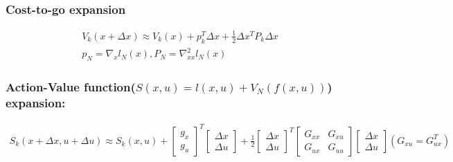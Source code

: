 \subsubsection{Cost-to-go expansion}
\begin{align}
    V_k(x + \Delta x) \approx V_k(x) + p_k^T \Delta x + \frac{1}{2}\Delta x^T P_k \Delta x \\
    p_N = \nabla_x l_N(x), P_N = \nabla_{xx}^2 l_N(x)
\end{align}

\subsubsection{Action-Value function($S(x,u) = l(x,u) + V_N(f(x,u))$) expansion:}
\begin{align}
    S_k(x + \Delta x, u + \Delta u) \approx S_k(x, u) +
    \begin{bmatrix}
        g_x \\ g_u
    \end{bmatrix}^T
    \begin{bmatrix}
        \Delta x \\ \Delta u
    \end{bmatrix} +
    \frac{1}{2} 
    \begin{bmatrix}
        \Delta x \\ \Delta u
    \end{bmatrix}^T
    \begin{bmatrix}
        G_{xx} & G_{xu} \\
        G_{ux} & G_{uu}
    \end{bmatrix}
    \begin{bmatrix}
        \Delta x \\ \Delta u
    \end{bmatrix} (G_{xu} = G_{ux}^T)
\end{align}


